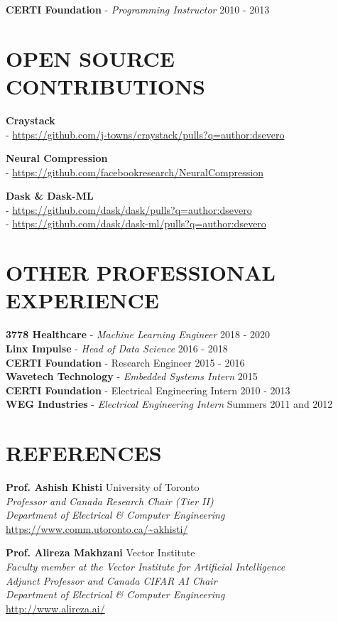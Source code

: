 \documentclass[margin, line]{res}
\begin{document}
\begin{resume}
\textbf{CERTI Foundation} - {\sl Programming Instructor} \hfill 2010 - 2013

\section{OPEN SOURCE CONTRIBUTIONS}
\textbf{Craystack}\\
- \url{https://github.com/j-towns/craystack/pulls?q=author:dsevero}

\textbf{Neural Compression}\\
- \url{https://github.com/facebookresearch/NeuralCompression}

\textbf{Dask \& Dask-ML}\\
- \url{https://github.com/dask/dask/pulls?q=author:dsevero}\\
- \url{https://github.com/dask/dask-ml/pulls?q=author:dsevero}

\section{OTHER PROFESSIONAL EXPERIENCE}
\textbf{3778 Healthcare} - {\sl Machine Learning Engineer} \hfill 2018 - 2020\\
\textbf{Linx Impulse} - {\sl Head of Data Science} \hfill 2016 - 2018\\
\textbf{CERTI Foundation} - Research Engineer \hfill 2015 - 2016\\
\textbf{Wavetech Technology} - {\sl Embedded Systems Intern} \hfill 2015\\
\textbf{CERTI Foundation} - Electrical Engineering Intern \hfill 2010 - 2013\\
\textbf{WEG Industries} - {\sl Electrical Engineering Intern} \hfill Summers 2011 and 2012

\section{REFERENCES}
\textbf{Prof. Ashish Khisti} \hfill University of Toronto\\
{\sl Professor and Canada Research Chair (Tier II)}\\
{\sl Department of Electrical \& Computer Engineering}\\
\url{https://www.comm.utoronto.ca/~akhisti/}

\textbf{Prof. Alireza Makhzani} \hfill Vector Institute\\
{\sl Faculty member at the Vector Institute for Artificial Intelligence}\\
{\sl Adjunct Professor and Canada CIFAR AI Chair}\\
{\sl Department of Electrical \& Computer Engineering}\\
\url{http://www.alireza.ai/}


\end{resume}
\end{document}

